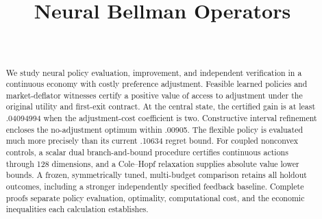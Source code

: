 \documentclass[ecta]{econsocart}
\theoremstyle{remark}
\begin{document}
\begin{frontmatter}
\title{Neural Bellman Operators}
\begin{aug}
\author[id=au1,addressref={add1}]{~}
\address[id=add1]{}
\end{aug}
\begin{abstract}
We study neural policy evaluation, improvement, and independent verification in a continuous economy with costly preference adjustment. Feasible learned policies and market-deflator witnesses certify a positive value of access to adjustment under the original utility and first-exit contract. At the central state, the certified gain is at least .04094994 when the adjustment-cost coefficient is two. Constructive interval refinement encloses the no-adjustment optimum within .00905. The flexible policy is evaluated much more precisely than its current .10634 regret bound. For coupled nonconvex controls, a scalar dual branch-and-bound procedure certifies continuous actions through 128 dimensions, and a Cole--Hopf relaxation supplies absolute value lower bounds. A frozen, symmetrically tuned, multi-budget comparison retains all holdout outcomes, including a stronger independently specified feedback baseline. Complete proofs separate policy evaluation, optimality, computational cost, and the economic inequalities each calculation establishes.
\end{abstract}
\begin{keyword}
\end{keyword}
\end{frontmatter}

\begin{appendix}

\end{appendix}

\end{document}
